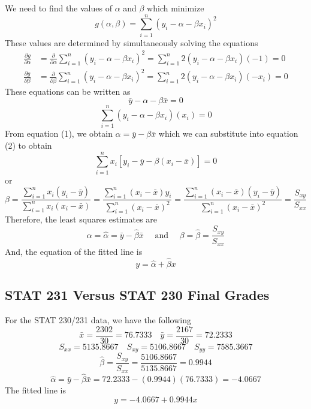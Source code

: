 We need to find the values of $ \alpha $ and $ \beta $ which minimize
\[g(\alpha, \beta)=\sum_{i=1}^{n}\left(y_{i}-\alpha-\beta x_{i}\right)^{2}\]
These values are determined by simultaneously solving the equations
\[
    \begin{aligned}
        \frac{\partial g}{\partial \alpha} & =\frac{\partial}{\partial \alpha} \sum_{i=1}^{n}\left(y_{i}-\alpha-\beta x_{i}\right)^{2}=\sum_{i=1}^{n} 2\left(y_{i}-\alpha-\beta x_{i}\right)(-1)=0               \\
        \frac{\partial g}{\partial \beta}  & =\frac{\partial}{\partial \beta} \sum_{i=1}^{n}\left(y_{i}-\alpha-\beta x_{i}\right)^{2}=\sum_{i=1}^{n} 2\left(y_{i}-\alpha-\beta x_{i}\right)\left(-x_{i}\right)=0
    \end{aligned}
\]
These equations can be written as
\begin{equation}\tag{1}
    \bar{y}-\alpha-\beta \bar{x}=0
\end{equation}
\begin{equation}\tag{2}
    \sum_{i=1}^{n}\left(y_{i}-\alpha-\beta x_{i}\right)\left(x_{i}\right)=0
\end{equation}
From equation (1), we obtain $ \alpha=\bar{y}-\beta \bar{x} $ which
we can substitute into equation (2) to obtain
\[\sum_{i=1}^{n} x_{i}\left[y_{i}-\bar{y}-\beta\left(x_{i}-\bar{x}\right)\right]=0\]
or
\[\beta=
    \frac{\sum\limits_{i=1}^{n} x_{i}\left(y_{i}-\bar{y}\right)}
    {\sum\limits_{i=1}^{n} x_{i}\left(x_{i}-\bar{x}\right)}
    =\frac{\sum\limits_{i=1}^{n}\left(x_{i}-\bar{x}\right) y_{i}}
    {\sum\limits_{i=1}^{n}\left(x_{i}-\bar{x}\right)^{2}}
    =\frac{\sum\limits_{i=1}^{n}\left(x_{i}-\bar{x}\right)\left(y_{i}-\bar{y}\right)}
    {\sum\limits_{i=1}^{n}\left(x_{i}-\bar{x}\right)^{2}}
    =\frac{S_{x y}}{S_{x x}}\]
Therefore, the least squares estimates are
\[\alpha=\hat{\alpha}=\bar{y}-\hat{\beta} \bar{x}
    \quad \text { and } \quad \beta=\hat{\beta}=\frac{S_{x y}}{S_{x x}}\]
And, the equation of the fitted line is
\[y=\hat{\alpha}+\hat{\beta} x\]

\subsection{STAT 231 Versus STAT 230 Final Grades}

\begin{exbox}
    \begin{example}
        For the STAT 230/231 data, we have the following
        \[\bar{x}=\frac{2302}{30}=76.7333 \quad \bar{y}=\frac{2167}{30}=72.2333\]
        \[S_{x x}=5135.8667 \quad S_{x y}=5106.8667 \quad S_{y y}=7585.3667\]
        \[\hat{\beta}=\frac{S_{x y}}{S_{x x}}=\frac{5106.8667}{5135.8667}=0.9944\]
        \[\hat{\alpha}=\bar{y}-\hat{\beta} \bar{x}=72.2333-(0.9944)(76.7333)=-4.0667\]
        The fitted line is
        \[y=-4.0667+0.9944 x\]
    \end{example}
\end{exbox}

